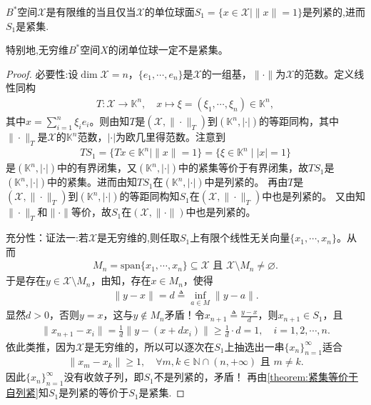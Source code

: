 \documentclass[../../main.tex]{subfiles}%
\begin{document}
\begin{theorem}\label{theorem:有限维B空间的充要条件11}
$B^*$空间$\mathscr{X}$是有限维的当且仅当$\mathscr{X}$的单位球面$S_1 = \{x \in \mathscr{X} \mid \|x\|=1\}$是列紧的,进而$S_1$是紧集.

特别地,无穷维$B^*$空间\(X\)的闭单位球一定不是紧集。
\end{theorem}
\begin{proof}

{\heiti 必要性:}设$\dim\mathscr{X}=n$，$\{e_1,\cdots,e_n\}$是$\mathscr{X}$的一组基，$\|\cdot\|$为$\mathscr{X}$的范数。定义线性同构
\begin{align*}
T:\mathscr{X}\to\mathbb{K}^n,\quad x\mapsto\xi=(\xi_1,\cdots,\xi_n)\in\mathbb{K}^n,
\end{align*}
其中$x=\sum\limits_{i=1}^n\xi_ie_i$。则由知$T$是$(\mathscr{X},\|\cdot\|_T)$到$(\mathbb{K}^n,|\cdot|)$的等距同构，其中$\|\cdot\|_T$是$\mathscr{X}$的$\mathbb{K}^n$范数，$|\cdot|$为欧几里得范数。注意到
\begin{align*}
TS_1=\{Tx\in\mathbb{K}^n\mid\|x\|=1\}=\{\xi\in\mathbb{K}^n\mid|x|=1\}
\end{align*}
是$(\mathbb{K}^n,|\cdot|)$中的有界闭集，又$(\mathbb{K}^n,|\cdot|)$中的紧集等价于有界闭集，故$TS_1$是$(\mathbb{K}^n,|\cdot|)$中的紧集。进而由知$TS_1$在$(\mathbb{K}^n,|\cdot|)$中是列紧的。
再由$T$是$(\mathscr{X},\|\cdot\|_T)$到$(\mathbb{K}^n,|\cdot|)$的等距同构知$S_1$在$(\mathscr{X},\|\cdot\|_T)$中也是列紧的。
又由知$\|\cdot\|_T$和$\|\cdot\|$等价，故$S_1$在$(\mathscr{X},\|\cdot\|)$中也是列紧的。

{\heiti 充分性：}{\color{blue}证法一:}若$\mathscr{X}$是无穷维的,则任取$S_1$上有限个线性无关向量$\{x_1,\cdots,x_n\}$。从而
\begin{align*}
M_n=\mathrm{span}\{x_1,\cdots,x_n\}\subseteq\mathscr{X} \text{ 且 } \mathscr{X}\setminus M_n\neq\varnothing.
\end{align*}
于是存在$y\in\mathscr{X}\setminus M_n$，由知，存在$x\in M_n$，使得
\begin{align*}
\|y-x\|=d\triangleq\inf\limits_{a\in M}\|y-a\|.
\end{align*}
显然$d>0$，否则$y=x$，这与$y\notin M_n$矛盾！令$x_{n+1}\triangleq\frac{y-x}{d}$，则$x_{n+1}\in S_1$，且
\begin{align*}
\|x_{n+1}-x_i\|=\frac{1}{d}\|y-(x+dx_i)\|\geqslant\frac{1}{d}\cdot d=1,\quad i=1,2,\cdots,n.
\end{align*}
依此类推，因为$\mathscr{X}$是无穷维的，所以可以逐次在$S_1$上抽选出一串$\{x_n\}_{n=1}^{\infty}$适合
\begin{align*}
\|x_m-x_k\|\geqslant1,\quad \forall m,k\in\mathbb{N}\cap(n,+\infty) \text{ 且 } m\neq k.
\end{align*}
因此$\{x_n\}_{n=1}^{\infty}$没有收敛子列，即$S_1$不是列紧的，矛盾！
再由\cref{theorem:紧集等价于自列紧}知$S_1$是列紧的等价于$S_1$是紧集.


\end{proof}
\end{document}
